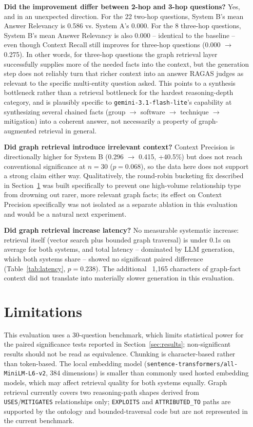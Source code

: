 \documentclass[conference]{IEEEtran}
\begin{document}
\textbf{Did the improvement differ between 2-hop and 3-hop questions?} Yes,
and in an unexpected direction. For the 22 two-hop questions, System B's
mean Answer Relevancy is 0.586 vs. System A's 0.000. For the 8 three-hop
questions, System B's mean Answer Relevancy is also 0.000 -- identical to
the baseline -- even though Context Recall still improves for three-hop
questions (0.000 $\to$ 0.275). In other words, for three-hop questions the
graph retrieval layer successfully supplies more of the needed facts into
the context, but the generation step does not reliably turn that richer
context into an answer RAGAS judges as relevant to the specific
multi-entity question asked. This points to a synthesis bottleneck rather
than a retrieval bottleneck for the hardest reasoning-depth category, and
is plausibly specific to \texttt{gemini-3.1-flash-lite}'s capability at
synthesizing several chained facts (group $\to$ software $\to$ technique
$\to$ mitigation) into a coherent answer, not necessarily a property of
graph-augmented retrieval in general.

\textbf{Did graph retrieval introduce irrelevant context?} Context
Precision is directionally higher for System B (0.296 $\to$ 0.415,
+40.5\%) but does not reach conventional significance at $n=30$
($p=0.068$), so the data here does not support a strong claim either way.
Qualitatively, the round-robin bucketing fix described in
Section~\ref{sec:limitations} was built specifically to prevent one
high-volume relationship type from drowning out rarer, more relevant graph
facts; its effect on Context Precision specifically was not isolated as a
separate ablation in this evaluation and would be a natural next
experiment.

\textbf{Did graph retrieval increase latency?} No measurable systematic
increase: retrieval itself (vector search plus bounded graph traversal) is
under 0.1s on average for both systems, and total latency -- dominated by
LLM generation, which both systems share -- showed no significant paired
difference (Table~\ref{tab:latency}, $p=0.238$). The additional ~1,165
characters of graph-fact context did not translate into materially slower
generation in this evaluation.

\section{Limitations}
\label{sec:limitations}
This evaluation uses a 30-question benchmark, which limits statistical
power for the paired significance tests reported in
Section~\ref{sec:results}; non-significant results should
not be read as equivalence. Chunking is character-based rather than
token-based. The local embedding model
(\texttt{sentence-transformers/all-MiniLM-L6-v2}, 384 dimensions) is smaller
than commonly used hosted embedding models, which may affect retrieval
quality for both systems equally. Graph retrieval currently covers two
reasoning-path shapes derived from \texttt{USES}/\texttt{MITIGATES}
relationships only; \texttt{EXPLOITS} and \texttt{ATTRIBUTED\_TO} paths are
supported by the ontology and bounded-traversal code but are not represented
in the current benchmark.
\end{document}
